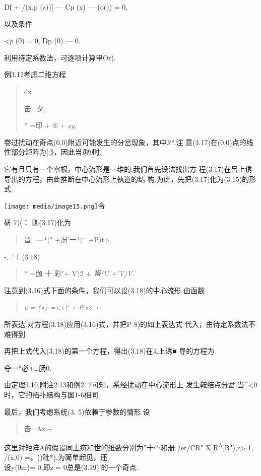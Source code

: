 \documentclass{article}
\begin{document}
Df + /(x,p (z)){]} --- Cp (x) --- (or)) = 0,

以及条件

\emph{\textless{}p} (0) = 0, Dp (0) --- 0.

利用待定系数法，可逐项计算甲Or).

例3.12考虑二维方程

\begin{quote}
dx

击=夕,

* =印 + ® + \emph{xy,}
\end{quote}

卷过扰动在奇点(0,0)附近可能发生的分岔现象，其中\emph{9*.}注
意(3.17)在(0,0)点的线性部分矩阵为{[}:》，因此当\emph{財0}时,

它有且只有一个零根，中心流形是一维的.我们首先设法找出方
程(3.17)在呂上诱导出的方程，由此推断在中心流形上執道的结
构.为此，先把(3.17)化为(3.15)的形式.

\texttt{[image: media/image15.png]}令

硏 7)(： 则(3.17)化为

\begin{quote}
晋=---*(" +汾'一*(`` +P)t\textgreater{},
\end{quote}

-. .' 1 (3.18)

\begin{quote}
* =伽 十 彩"+ V)2 + \emph{帯(U +'V)V.}
\end{quote}

注意到(3.16)式下面的条件，我们可以设(3.18)的中心流形 由函数

\begin{quote}
\emph{v = («) =\textless{}»? + \&«? +}
\end{quote}

所表达.对方程(3.18)应用(3.16)式，并把P 8)的如上表达式
代入，由待定系数法不难得到

再把上式代入(3.18)的第一个方程，得出(3.18)在£上诱■ 导的方程为

夺一*必+\ldots{}肠0.

由定理3.10,附注2.13和例2. 7可知，系经扰动在中心流形上
发生鞍结点分岔.当\^{}\textless{}0时，它的拓扑结构与图1-6相同.

最后，我们考虑系统(3. 5)依赖于参数的情形.设

\begin{quote}
击=Az +
\end{quote}

这里对矩阵A的假设同上疥和世的维数分别为''十宀和册 /et/CR" X
R\textsuperscript{A},R"),r\textgreater{} 1, /(x,0)
=。(\textbar{})毗*).为简单起见，还\\
设y(0m)= 0,即z = 0总是(3.19)'的一个奇点.
\end{document}
